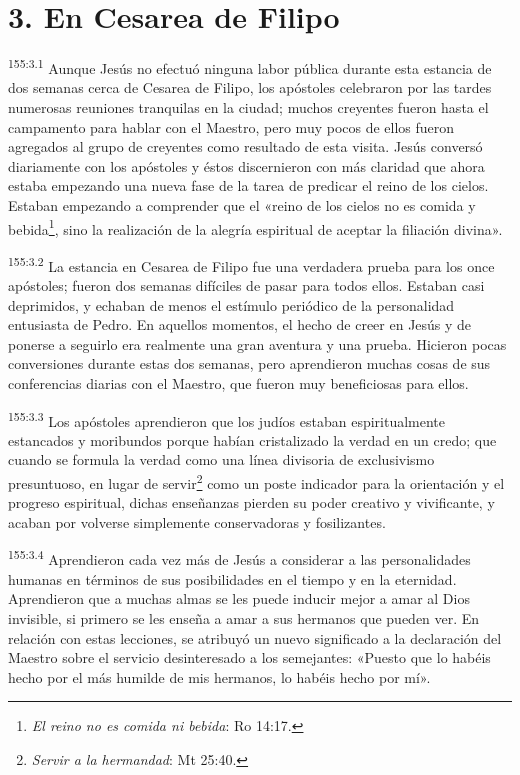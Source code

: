 \section*{3. En Cesarea de Filipo}
\par 
\textsuperscript{155:3.1} Aunque Jesús no efectuó ninguna labor pública durante esta estancia de dos semanas cerca de Cesarea de Filipo, los apóstoles celebraron por las tardes numerosas reuniones tranquilas en la ciudad; muchos creyentes fueron hasta el campamento para hablar con el Maestro, pero muy pocos de ellos fueron agregados al grupo de creyentes como resultado de esta visita. Jesús conversó diariamente con los apóstoles y éstos discernieron con más claridad que ahora estaba empezando una nueva fase de la tarea de predicar el reino de los cielos. Estaban empezando a comprender que el «reino de los cielos no es comida y bebida\footnote{\textit{El reino no es comida ni bebida}: Ro 14:17.}, sino la realización de la alegría espiritual de aceptar la filiación divina».

\par 
\textsuperscript{155:3.2} La estancia en Cesarea de Filipo fue una verdadera prueba para los once apóstoles; fueron dos semanas difíciles de pasar para todos ellos. Estaban casi deprimidos, y echaban de menos el estímulo periódico de la personalidad entusiasta de Pedro. En aquellos momentos, el hecho de creer en Jesús y de ponerse a seguirlo era realmente una gran aventura y una prueba. Hicieron pocas conversiones durante estas dos semanas, pero aprendieron muchas cosas de sus conferencias diarias con el Maestro, que fueron muy beneficiosas para ellos.

\par 
\textsuperscript{155:3.3} Los apóstoles aprendieron que los judíos estaban espiritualmente estancados y moribundos porque habían cristalizado la verdad en un credo; que cuando se formula la verdad como una línea divisoria de exclusivismo presuntuoso, en lugar de servir\footnote{\textit{Servir a la hermandad}: Mt 25:40.} como un poste indicador para la orientación y el progreso espiritual, dichas enseñanzas pierden su poder creativo y vivificante, y acaban por volverse simplemente conservadoras y fosilizantes.

\par 
\textsuperscript{155:3.4} Aprendieron cada vez más de Jesús a considerar a las personalidades humanas en términos de sus posibilidades en el tiempo y en la eternidad. Aprendieron que a muchas almas se les puede inducir mejor a amar al Dios invisible, si primero se les enseña a amar a sus hermanos que pueden ver. En relación con estas lecciones, se atribuyó un nuevo significado a la declaración del Maestro sobre el servicio desinteresado a los semejantes: «Puesto que lo habéis hecho por el más humilde de mis hermanos, lo habéis hecho por mí».

